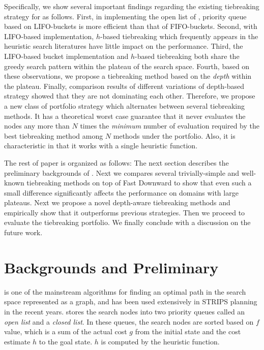 Specifically, we show several important findings regarding the
existing tiebreaking strategy for \astar as follows.
% 
First, in implementing the open list of \astar, priority queue based on
LIFO-buckets is more efficient than that of FIFO-buckets.
% 
Second, with LIFO-based implementation, $h$-based tiebreaking which
frequently appears in the heuristic search literatures have little
impact on the performance.
% 
Third, the LIFO-based bucket implementation and $h$-based tiebreaking
both share the greedy search pattern within the plateau of the
search space.
% 
Fourth, based on these observations, we propose a tiebreaking
method based on the \emph{depth} within the plateau.
%
Finally, comparison results of different variations of depth-based
strategy showed that they are not dominating each other. Therefore, we
propose a new class of portfolio strategy which alternates between
several tiebreaking methods.
It has a theoretical worst case guarantee that it
never evaluates the nodes any more than $N$ times the \emph{minimum} number
of evaluation required by the best tiebreaking method among $N$ methods
under the portfolio.
Also, it is characteristic in that it works with a single heuristic function.
% 

The rest of paper is organized as follows: The next section describes the
preliminary backgrounds of \astar.
Next we compares several trivially-simple and well-known tiebreaking
methods on top of Fast Downward to show that even such a small
difference significantly affects the performance on domains with
large plateaus.
Next we propose a novel depth-aware tiebreaking methods and empirically
show that it outperforms previous strategies.
Then we proceed to evaluate the tiebreaking portfolio.
We finally conclude with a discussion on the future work.

\section{Backgrounds and Preliminary}
\label{sec-1}


\astar is one of the mainstream algorithms for finding an optimal path in the
search space represented as a graph, and has been used extensively in
STRIPS planning in the recent years.
\astar stores the search nodes into two priority queues called an
\emph{open list} and a \emph{closed list}. In these queues, the search
nodes are sorted based on $f$ value, which is a sum of the actual cost
$g$ from the initial state and the cost estimate $h$ to the goal
state. $h$ is computed by the heuristic function.

